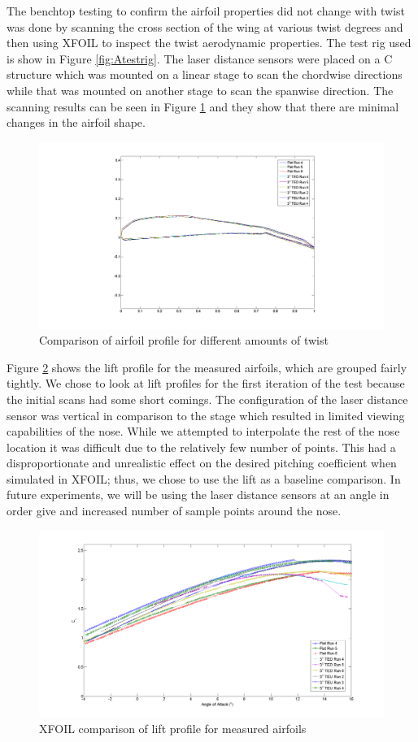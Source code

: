 \documentclass[11pt]{ucthesis}
\begin{document}
The benchtop testing to confirm the airfoil properties did not change with twist was done by scanning the cross section of the wing at various twist degrees and then using XFOIL to inspect the twist aerodynamic properties. The test rig used is show in Figure \ref{fig:Atestrig}. The laser distance sensors were placed on a C structure which was mounted on a linear stage to scan the chordwise directions while that was mounted on another stage to scan the spanwise direction. The scanning results can be seen in Figure \ref{fig:Ascan} and they show that there are minimal changes in the airfoil shape.

\begin{figure}[h]
\centering
\includegraphics[width=0.75\linewidth]{Figures/AirfoilDirectMeasurements.png}
\caption{Comparison of airfoil profile for different amounts of twist}
\label{fig:Ascan}
\end{figure}

Figure \ref{fig:Alift} shows the lift profile for the measured airfoils, which are grouped fairly tightly. We chose to look at lift profiles for the first iteration of the test because the initial scans had some short comings. The configuration of the laser distance sensor was vertical in comparison to the stage which resulted in limited viewing capabilities of the nose. While we attempted to interpolate the rest of the nose location it was difficult due to the relatively few number of points. This had a disproportionate and unrealistic effect on the desired pitching coefficient when simulated in XFOIL; thus, we chose to use the lift as a baseline comparison. In future experiments, we will be using the laser distance sensors at an angle in order give and increased number of sample points around the nose.

\begin{figure}[h]
\centering
\includegraphics[width=0.75\linewidth]{Figures/CLDirectMeasurements.png}
\caption{XFOIL comparison of lift profile for measured airfoils}
\label{fig:Alift}
\end{figure}
\end{document}
